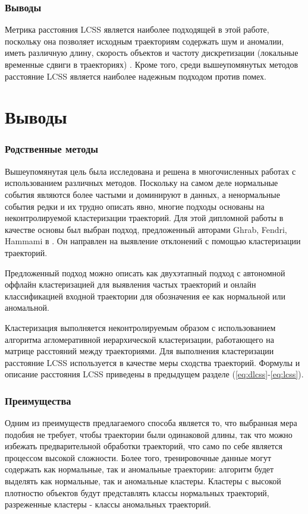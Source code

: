 \subsubsection{Выводы}

Метрика расстояния LCSS является наиболее подходящей в этой работе, поскольку она позволяет исходным траекториям содержать шум и аномалии, иметь различную длину, скорость объектов и частоту дискретизации (локальные временные сдвиги в траекториях) \cite{inproceedings:7_related_work}. Кроме того, среди вышеупомянутых методов расстояние LCSS является наиболее надежным подходом против помех.

\section{Выводы}

\subsubsection{Родственные методы}

Вышеупомянутая цель была исследована и решена в многочисленных работах с использованием различных методов. Поскольку на самом деле нормальные события являются более частыми и доминируют в данных, а ненормальные события редки и их трудно описать явно, многие подходы основаны на неконтролируемой кластеризации траекторий. Для этой дипломной работы в качестве основы был выбран подход, предложенный авторами Ghrab, Fendri, Hammami в \cite{inproceedings:7_related_work}. Он направлен на выявление отклонений с помощью кластеризации траекторий.

Предложенный подход можно описать как двухэтапный подход с автономной оффлайн кластеризацией для выявления частых траекторий и онлайн классификацией входной траектории для обозначения ее как нормальной или аномальной.

Кластеризация выполняется неконтролируемым образом с использованием алгоритма агломеративной иерархической кластеризации, работающего на матрице расстояний между траекториями. Для выполнения кластеризации расстояние LCSS используется в качестве меры сходства траекторий. Формулы и описание расстояния LCSS приведены в предыдущем разделе (\ref{eq:dlcss}-\ref{eq:lcss}).

\subsubsection{Преимущества}

Одним из преимуществ предлагаемого способа является то, что выбранная мера подобия не требует, чтобы траектории были одинаковой длины, так что можно избежать предварительной обработки траекторий, что само по себе является процессом высокой сложности. Более того, тренировочные данные могут содержать как нормальные, так и аномальные траектории: алгоритм будет выделять как нормальные, так и аномальные кластеры. Кластеры с высокой плотностю объектов будут представлять классы нормальных траекторий, разреженные кластеры - классы аномальных траекторий.

